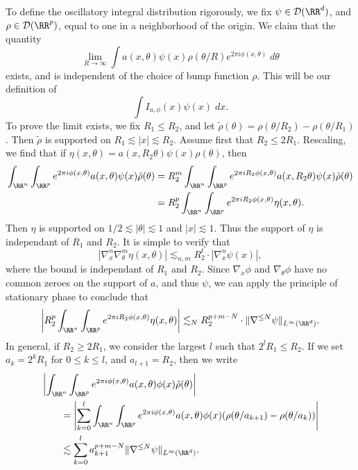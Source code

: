 To define the oscillatory integral distribution rigorously, we fix $\psi \in \mathcal{D}(\RR^d)$, and $\rho \in \mathcal{D}(\RR^p)$, equal to one in a neighborhood of the origin. We claim that the quantity
%
\[ \lim_{R \to \infty} \int a(x,\theta) \psi(x) \rho(\theta / R) e^{2 \pi i \phi(x,\theta)}\; d\theta \]
%
exists, and is independent of the choice of bump function $\rho$. This will be our definition of
%
\[ \int I_{a,\phi}(x) \psi(x)\; dx. \]
%
To prove the limit exists, we fix $R_1 \leq R_2$, and let $\tilde{\rho}(\theta) = \rho(\theta/R_2) - \rho(\theta/R_1)$. Then $\tilde{\rho}$ is supported on $R_1 \lesssim |x| \lesssim R_2$. Assume first that $R_2 \leq 2R_1$. Rescaling, we find that if $\eta(x,\theta) = a(x,R_2 \theta) \psi(x) \rho(\theta)$, then
%
\begin{align*}
    \int_{\RR^n} \int_{\RR^p} e^{2 \pi i \phi(x,\theta)} a(x,\theta) \psi(x) \tilde{\rho}(\theta) &= R_2^m \int_{\RR^n} \int_{\RR^p} e^{2 \pi i R_2 \phi(x,\theta)} a(x,R_2 \theta) \psi(x) \tilde{\rho}(\theta)\\
    &= R_2^p \int_{\RR^n} \int_{\RR^p} e^{2 \pi i R_2 \phi(x,\theta)} \eta(x,\theta).
\end{align*}
%
Then $\eta$ is supported on $1/2 \lesssim |\theta| \lesssim 1$ and $|x| \lesssim 1$. Thus the support of $\eta$ is independant of $R_1$ and $R_2$. It is simple to verify that
%
\[ |\nabla^n_x \nabla^m_\theta \eta(x,\theta)| \lesssim_{n,m} R_2^t \cdot |\nabla^n_x \psi(x)|, \]
%
where the bound is independant of $R_1$ and $R_2$. Since $\nabla_x \phi$ and $\nabla_\theta \phi$ have no common zeroes on the support of $a$, and thus $\psi$, we can apply the principle of stationary phase to conclude that
%
\[ \left| R_2^p \int_{\RR^n} \int_{\RR^p} e^{2 \pi i R_2 \phi(x,\theta)} \eta(x,\theta) \right| \lesssim_N R_2^{p + m - N} \cdot \| \nabla^{\leq N} \psi \|_{L^\infty(\RR^d)}. \]
%
In general, if $R_2 \geq 2R_1$, we consider the largest $l$ such that $2^l R_1 \leq R_2$. If we set $a_k = 2^k R_1$ for $0 \leq k \leq l$, and $a_{l+1} = R_2$, then we write
%
\begin{align*}
    &\left| \int_{\RR^n} \int_{\RR^p} e^{2 \pi i \phi(x,\theta)} a(x,\theta) \phi(x) \tilde{\rho}(\theta) \right|\\
    &\quad\quad= \left| \sum_{k = 0}^l \int_{\RR^n} \int_{\RR^p} e^{2 \pi i \phi(x,\theta)} a(x,\theta) \phi(x) (\rho(\theta/a_{k+1}) - \rho(\theta / a_k)) \right|\\
    &\quad\quad\lesssim \sum_{k = 0}^l a_{k+1}^{p + m - N} \| \nabla^{\leq N} \psi \|_{L^\infty(\RR^d)}. 
\end{align*}
